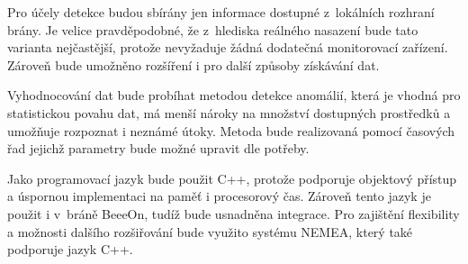  Pro účely detekce budou sbírány jen informace dostupné z~lokálních rozhraní brány.
 Je velice pravděpodobné, že z~hlediska reálného nasazení bude tato varianta nejčastější, 
 protože nevyžaduje žádná dodatečná monitorovací zařízení.
 Zároveň bude umožněno rozšíření i pro další
 způsoby získávání dat. 
 
 Vyhodnocování dat bude probíhat metodou detekce anomálií, která je vhodná pro statistickou povahu dat,
 má menší nároky na množství dostupných prostředků a umožňuje rozpoznat i neznámé útoky. Metoda 
 bude realizovaná pomocí časových řad jejichž parametry bude možné upravit dle potřeby.
 
 Jako programovací jazyk bude použit C++, protože podporuje objektový přístup a
 úspornou implementaci na paměť i procesorový čas. Zároveň tento jazyk je použit i v~bráně
 BeeeOn, tudíž bude usnadněna integrace. Pro zajištění flexibility a možnosti dalšího rozšiřování 
 bude využito systému NEMEA, který také podporuje jazyk C++. 
